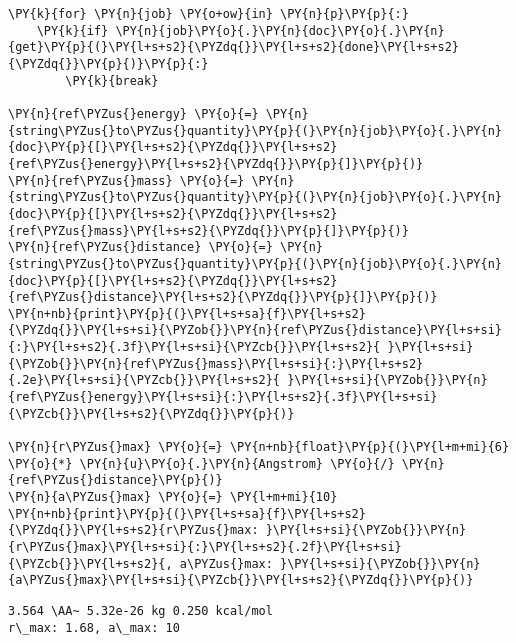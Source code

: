     \begin{tcolorbox}[breakable, size=fbox, boxrule=1pt, pad at break*=1mm,colback=cellbackground, colframe=cellborder]
\begin{Verbatim}[commandchars=\\\{\}]
\PY{k}{for} \PY{n}{job} \PY{o+ow}{in} \PY{n}{p}\PY{p}{:}
    \PY{k}{if} \PY{n}{job}\PY{o}{.}\PY{n}{doc}\PY{o}{.}\PY{n}{get}\PY{p}{(}\PY{l+s+s2}{\PYZdq{}}\PY{l+s+s2}{done}\PY{l+s+s2}{\PYZdq{}}\PY{p}{)}\PY{p}{:}
        \PY{k}{break}
        
\PY{n}{ref\PYZus{}energy} \PY{o}{=} \PY{n}{string\PYZus{}to\PYZus{}quantity}\PY{p}{(}\PY{n}{job}\PY{o}{.}\PY{n}{doc}\PY{p}{[}\PY{l+s+s2}{\PYZdq{}}\PY{l+s+s2}{ref\PYZus{}energy}\PY{l+s+s2}{\PYZdq{}}\PY{p}{]}\PY{p}{)}
\PY{n}{ref\PYZus{}mass} \PY{o}{=} \PY{n}{string\PYZus{}to\PYZus{}quantity}\PY{p}{(}\PY{n}{job}\PY{o}{.}\PY{n}{doc}\PY{p}{[}\PY{l+s+s2}{\PYZdq{}}\PY{l+s+s2}{ref\PYZus{}mass}\PY{l+s+s2}{\PYZdq{}}\PY{p}{]}\PY{p}{)}
\PY{n}{ref\PYZus{}distance} \PY{o}{=} \PY{n}{string\PYZus{}to\PYZus{}quantity}\PY{p}{(}\PY{n}{job}\PY{o}{.}\PY{n}{doc}\PY{p}{[}\PY{l+s+s2}{\PYZdq{}}\PY{l+s+s2}{ref\PYZus{}distance}\PY{l+s+s2}{\PYZdq{}}\PY{p}{]}\PY{p}{)}
\PY{n+nb}{print}\PY{p}{(}\PY{l+s+sa}{f}\PY{l+s+s2}{\PYZdq{}}\PY{l+s+si}{\PYZob{}}\PY{n}{ref\PYZus{}distance}\PY{l+s+si}{:}\PY{l+s+s2}{.3f}\PY{l+s+si}{\PYZcb{}}\PY{l+s+s2}{ }\PY{l+s+si}{\PYZob{}}\PY{n}{ref\PYZus{}mass}\PY{l+s+si}{:}\PY{l+s+s2}{.2e}\PY{l+s+si}{\PYZcb{}}\PY{l+s+s2}{ }\PY{l+s+si}{\PYZob{}}\PY{n}{ref\PYZus{}energy}\PY{l+s+si}{:}\PY{l+s+s2}{.3f}\PY{l+s+si}{\PYZcb{}}\PY{l+s+s2}{\PYZdq{}}\PY{p}{)}

\PY{n}{r\PYZus{}max} \PY{o}{=} \PY{n+nb}{float}\PY{p}{(}\PY{l+m+mi}{6} \PY{o}{*} \PY{n}{u}\PY{o}{.}\PY{n}{Angstrom} \PY{o}{/} \PY{n}{ref\PYZus{}distance}\PY{p}{)}
\PY{n}{a\PYZus{}max} \PY{o}{=} \PY{l+m+mi}{10}
\PY{n+nb}{print}\PY{p}{(}\PY{l+s+sa}{f}\PY{l+s+s2}{\PYZdq{}}\PY{l+s+s2}{r\PYZus{}max: }\PY{l+s+si}{\PYZob{}}\PY{n}{r\PYZus{}max}\PY{l+s+si}{:}\PY{l+s+s2}{.2f}\PY{l+s+si}{\PYZcb{}}\PY{l+s+s2}{, a\PYZus{}max: }\PY{l+s+si}{\PYZob{}}\PY{n}{a\PYZus{}max}\PY{l+s+si}{\PYZcb{}}\PY{l+s+s2}{\PYZdq{}}\PY{p}{)}
\end{Verbatim}
\end{tcolorbox}

    \begin{Verbatim}[commandchars=\\\{\}]
3.564 \AA~ 5.32e-26 kg 0.250 kcal/mol
r\_max: 1.68, a\_max: 10
    \end{Verbatim}

